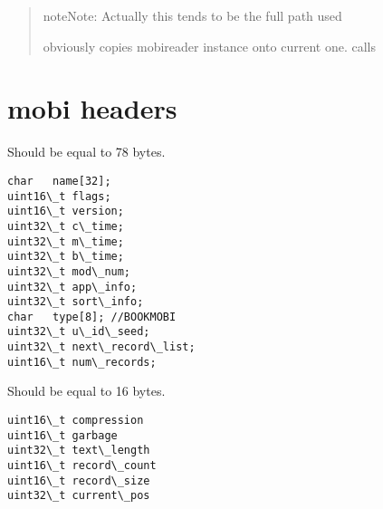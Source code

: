 \documentclass[letterpaper,10pt,english]{sphinxmanual}
\begin{document}
\begin{quote}
\begin{fulllineitems}
\begin{notice}{note}{Note:}
Actually this tends to be the full path used
\end{notice}

\end{fulllineitems}


\begin{fulllineitems}
\label{mobireader:mobireader::assign-operator__mobireaderCR}
obviously copies mobireader instance onto current one.
calls {\hyperref[mobireader:mobireader::load_file__ssR]{}}

\end{fulllineitems}

\end{quote}


\section{mobi headers}
\label{headers:mobi-headers}\label{headers::doc}

\begin{fulllineitems}
\label{headers:st_palmdoc_db}
Should be equal to 78 bytes.

\begin{Verbatim}[commandchars=\\\{\}]
char   name[32];
uint16\_t flags;
uint16\_t version;
uint32\_t c\_time;
uint32\_t m\_time;
uint32\_t b\_time;
uint32\_t mod\_num;
uint32\_t app\_info;
uint32\_t sort\_info;
char   type[8]; //BOOKMOBI
uint32\_t u\_id\_seed;
uint32\_t next\_record\_list;
uint16\_t num\_records;
\end{Verbatim}

\end{fulllineitems}


\begin{fulllineitems}
\label{headers:st_palmdoc}
Should be equal to 16 bytes.

\begin{Verbatim}[commandchars=\\\{\}]
uint16\_t compression
uint16\_t garbage
uint32\_t text\_length
uint16\_t record\_count
uint16\_t record\_size
uint32\_t current\_pos
\end{Verbatim}

\end{fulllineitems}
\end{document}
